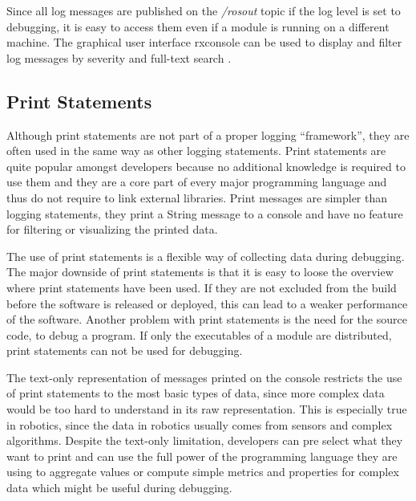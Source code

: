 Since all log messages are published on the \emph{/rosout} topic if the log level is set to debugging, it is easy to access them even if a module is running on a different machine. The graphical user interface rxconsole can be used to display and filter log messages by severity and full-text search \cite{rxconsole}.

\subsection{Print Statements}
Although print statements are not part of a proper logging ``framework'', they are often used in the same way as other logging statements. Print statements are quite popular amongst developers because no additional knowledge is required to use them and they are a core part of every major programming language and thus do not require to link external libraries. Print messages are simpler than logging statements, they print a String message to a console and have no feature for filtering or visualizing the printed data.

The use of print statements is a flexible way of collecting data during debugging. The major downside of print statements is that it is easy to loose the overview where print statements have been used. If they are not excluded from the build before the software is released or deployed, this can lead to a weaker performance of the software. Another problem with print statements is the need for the source code, to debug a program. If only the executables of a module are distributed, print statements can not be used for debugging.

The text-only representation of messages printed on the console restricts the use of print statements to the most basic types of data, since more complex data would be too hard to understand in its raw representation. This is especially true in robotics, since the data in robotics usually comes from sensors and complex algorithms. Despite the text-only limitation, developers can pre select what they want to print and can use the full power of the programming language they are using to aggregate values or compute simple metrics and properties for complex data which might be useful during debugging.



